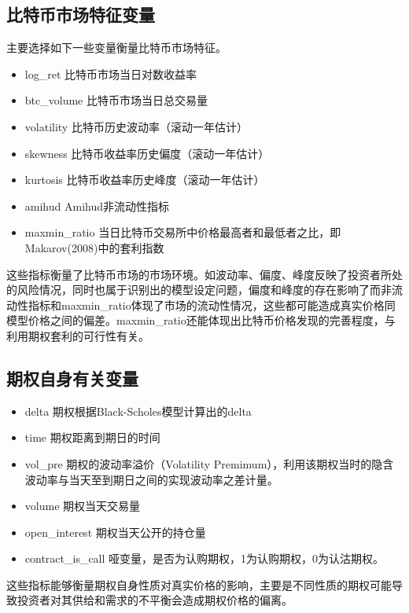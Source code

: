 {\subsection{比特币市场特征变量}
\par{主要选择如下一些变量衡量比特币市场特征。}
\begin{itemize}
\item log\_ret 比特币市场当日对数收益率
\item btc\_volume 比特币市场当日总交易量
\item volatility 比特币历史波动率（滚动一年估计）
\item skewness 比特币收益率历史偏度（滚动一年估计）
\item kurtosis 比特币收益率历史峰度（滚动一年估计）
\item amihud Amihud非流动性指标
\item maxmin\_ratio 当日比特币交易所中价格最高者和最低者之比，即Makarov(2008)中的套利指数\cite{Makarov-2018}
\end{itemize}

这些指标衡量了比特币市场的市场环境。如波动率、偏度、峰度反映了投资者所处的风险情况，同时也属于识别出的模型设定问题，偏度和峰度的存在影响了而非流动性指标和maxmin\_ratio体现了市场的流动性情况，这些都可能造成真实价格同模型价格之间的偏差。maxmin\_ratio还能体现出比特币价格发现的完善程度，与利用期权套利的可行性有关。
\subsection{期权自身有关变量}
\begin{itemize}
\item delta 期权根据Black-Scholes模型计算出的delta
\item time 期权距离到期日的时间
\item vol\_pre 期权的波动率溢价（Volatility Premimum），利用该期权当时的隐含波动率与当天至到期日之间的实现波动率之差计量。
\item volume 期权当天交易量                                     

\item open\_interest 期权当天公开的持仓量
\item contract\_is\_call 哑变量，是否为认购期权，1为认购期权，0为认沽期权。 
\end{itemize}
这些指标能够衡量期权自身性质对真实价格的影响，主要是不同性质的期权可能导致投资者对其供给和需求的不平衡会造成期权价格的偏离。


}
